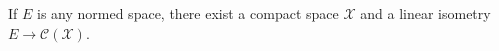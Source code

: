If $E$ is any normed space, there exist a compact space $\mathcal{X}$ and a linear isometry $E \to \mathcal{C}(\mathcal{X})$.
